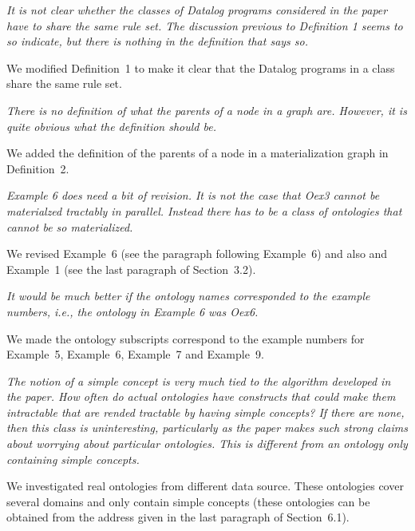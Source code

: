 \documentclass{article}
\let\quoteOld\quote
\let\endquoteOld\endquote
\renewenvironment{quote}{\quoteOld\itshape}{\endquoteOld}
\begin{document}
\begin{quote}
It is not clear whether the classes of Datalog programs considered in the
paper have to share the same rule set.  The discussion previous to
Definition 1 seems to so indicate, but there is nothing in the definition
that says so.
\end{quote}

We modified Definition~1 to make it clear that the Datalog programs
in a class share the same rule set.

\begin{quote}
There is no definition of what the parents of a node in a graph are.
However, it is quite obvious what the definition should be.
\end{quote}

We added the definition of the parents of a node in a materialization graph in Definition~2.

\begin{quote}
Example 6 does need a bit of revision.  It is not the case that Oex3 cannot
be materialzed tractably in parallel.  Instead there has to be a class of
ontologies that cannot be so materialized.
\end{quote}

We revised Example~6 (see the paragraph following Example~6) and also
and Example~1 (see the last paragraph of Section~3.2).


\begin{quote}
It would be much better if the ontology names corresponded to the example
numbers, i.e., the ontology in Example 6 was Oex6.
\end{quote}

We made the ontology subscripts correspond to the example numbers
for Example~5, Example~6, Example~7 and Example~9.


\begin{quote}
The notion of a simple concept is very much tied to the algorithm developed
in the paper.  How often do actual ontologies have constructs that could
make them intractable that are rended tractable by having simple concepts?
If there are none, then this class is uninteresting, particularly as the
paper makes such strong claims about worrying about particular ontologies.
This is different from an ontology only containing simple concepts.
\end{quote}


We investigated real ontologies from different data source. These ontologies cover
several domains and only contain simple concepts (these ontologies can be
obtained from the address given in the last paragraph of
Section~6.1).\\
\end{document}
